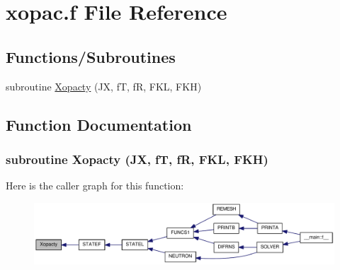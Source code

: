 \hypertarget{xopac_8f}{
\section{xopac.f File Reference}
\label{xopac_8f}
}
\subsection*{Functions/Subroutines}
\begin{DoxyCompactItemize}
\item 
subroutine \hyperlink{xopac_8f_a69c1c4895f63c9ca1c9f2940c2d374fa}{Xopacty} (JX, fT, fR, FKL, FKH)
\end{DoxyCompactItemize}


\subsection{Function Documentation}
\hypertarget{xopac_8f_a69c1c4895f63c9ca1c9f2940c2d374fa}{
\subsubsection[{Xopacty}]{\setlength{\rightskip}{0pt plus 5cm}subroutine Xopacty (JX, \/  fT, \/  fR, \/  FKL, \/  FKH)}}
\label{xopac_8f_a69c1c4895f63c9ca1c9f2940c2d374fa}


Here is the caller graph for this function:\nopagebreak
\begin{figure}[H]
\begin{center}
\leavevmode
\includegraphics[width=335pt]{xopac_8f_a69c1c4895f63c9ca1c9f2940c2d374fa_icgraph}
\end{center}
\end{figure}
